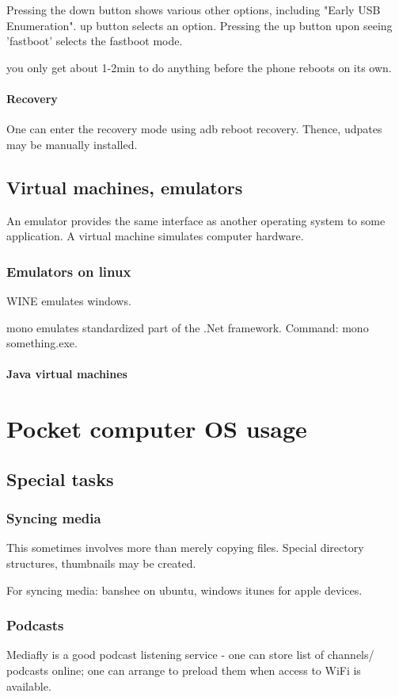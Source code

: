Pressing the down button shows various other options, including "Early USB Enumeration". up button selects an option. Pressing the up button upon seeing 'fastboot' selects the fastboot mode.

you only get about 1-2min to do anything before the phone reboots on its own. \chk

\subsubsection{Recovery}
One can enter the recovery mode using adb reboot recovery. Thence, udpates may be manually installed.

\section{Virtual machines, emulators}
An emulator provides the same interface as another operating system to some application. A virtual machine simulates computer hardware.

\subsection{Emulators on linux}
WINE emulates windows.

mono emulates standardized part of the .Net framework. Command: mono something.exe.

\subsubsection{Java virtual machines}
\tbc

\chapter{Pocket computer OS usage}
\section{Special tasks}
\subsection{Syncing media}
This sometimes involves more than merely copying files. Special directory structures, thumbnails may be created.

For syncing media: banshee on ubuntu, windows itunes for apple devices.



\subsection{Podcasts}
Mediafly is a good podcast listening service - one can store list of channels/ podcasts online; one can arrange to preload them when access to WiFi is  available.

